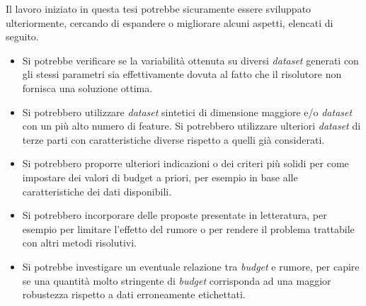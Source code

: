 Il lavoro iniziato in questa tesi potrebbe sicuramente essere sviluppato ulteriormente, cercando di espandere o migliorare alcuni aspetti, elencati di seguito.
\begin{itemize}
    \item Si potrebbe verificare se la variabilità ottenuta su diversi \emph{dataset} generati con gli stessi parametri sia effettivamente dovuta al fatto che il risolutore non fornisca una soluzione ottima. 
    \item Si potrebbero utilizzare \emph{dataset} sintetici di dimensione maggiore e/o \emph{dataset} con un più alto numero di feature. Si potrebbero utilizzare ulteriori \emph{dataset} di terze parti con caratteristiche diverse rispetto a quelli già considerati.
    \item Si potrebbero proporre ulteriori indicazioni o dei criteri più solidi per come impostare dei valori di budget a priori, per esempio in base alle caratteristiche dei dati disponibili.
    \item Si potrebbero incorporare delle proposte presentate in letteratura, per esempio per limitare l'effetto del rumore o per rendere il problema trattabile con altri metodi risolutivi.
    \item Si potrebbe investigare un eventuale relazione tra \emph{budget} e rumore, per capire se una quantità molto stringente di \emph{budget} corrisponda ad una maggior robustezza rispetto a dati erroneamente etichettati.
\end{itemize}


